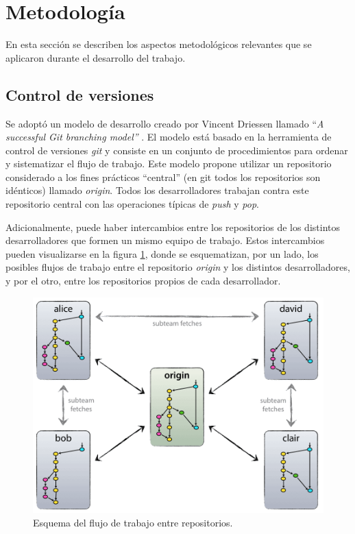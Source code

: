 \clearpage



\section{Metodología}

En esta sección se describen los aspectos metodológicos relevantes que se aplicaron durante el desarrollo del trabajo.  

\subsection{Control de versiones}
\label{subsec:branching}

Se adoptó un modelo de desarrollo creado por Vincent Driessen llamado ``\textit{A successful Git branching model''} \citep{Driessen}.  El modelo está basado en la herramienta de control de versiones \textit{git} y consiste en un conjunto de procedimientos para ordenar y sistematizar el flujo de trabajo. Este modelo propone utilizar un repositorio considerado a los fines prácticos ``central'' (en git todos los repositorios son idénticos) llamado \textit{origin}.  Todos los desarrolladores trabajan contra este repositorio central con las operaciones típicas de \textit{push} y \textit{pop}.  

Adicionalmente, puede haber intercambios entre los repositorios de los distintos desarrolladores que formen un mismo equipo de trabajo. Estos intercambios pueden visualizarse en la figura \ref{fig:esquema-repos}, donde se esquematizan, por un lado, los posibles flujos de trabajo entre el repositorio \textit{origin} y los distintos desarrolladores, y por el otro, entre los repositorios propios de cada desarrollador. 

\begin{figure}[ht]
	\centering
	\includegraphics[width=.6\textwidth]{./Figures/centr-decentr@2x.png}
	\caption[Esquema del flujo de trabajo entre repositorios]{Esquema del flujo de trabajo entre repositorios\protect\footnotemark.}
	\label{fig:esquema-repos}
\end{figure}

